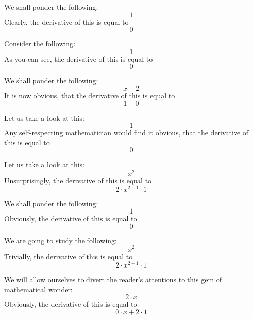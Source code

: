 \documentclass{article}
\begin{document}
We shall ponder the following:
\begin{equation}
1 
\end{equation}
Clearly, the derivative of this is equal to
\begin{equation}
0 
\end{equation}

Consider the following:
\begin{equation}
1 
\end{equation}
As you can see, the derivative of this is equal to
\begin{equation}
0 
\end{equation}

We shall ponder the following:
\begin{equation}
x - 2 
\end{equation}
It is now obvious, that the derivative of this is equal to
\begin{equation}
1 - 0 
\end{equation}

Let us take a look at this:
\begin{equation}
1 
\end{equation}
Any self-respecting mathematician would find it obvious, that the derivative of this is equal to
\begin{equation}
0 
\end{equation}

Let us take a look at this:
\begin{equation}
x ^{2 } 
\end{equation}
Unsurprisingly, the derivative of this is equal to
\begin{equation}
2 \cdot x ^{2 - 1 } \cdot 1 
\end{equation}

We shall ponder the following:
\begin{equation}
1 
\end{equation}
Obviously, the derivative of this is equal to
\begin{equation}
0 
\end{equation}

We are going to study the following:
\begin{equation}
x ^{2 } 
\end{equation}
Trivially, the derivative of this is equal to
\begin{equation}
2 \cdot x ^{2 - 1 } \cdot 1 
\end{equation}

We will allow ourselves to divert the reader's attentions to this gem of mathematical wonder:
\begin{equation}
2 \cdot x 
\end{equation}
Obviously, the derivative of this is equal to
\begin{equation}
0 \cdot x + 2 \cdot 1 
\end{equation}
\end{document}
